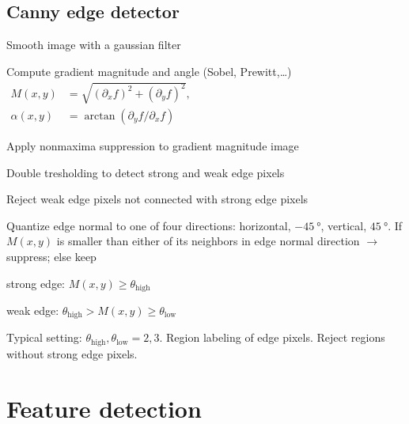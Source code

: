 \subsection{Canny edge detector}
\begin{enumerate*}[label=\protect\circled{\arabic*},itemjoin=]
	\item Smooth image with a gaussian filter\\
	\item Compute gradient magnitude and angle (Sobel, Prewitt,\ldots)\\
		$
		\begin{aligned}
			M(x,y)&=\sqrt{\left( \partial_xf \right)^2+\left( \partial_yf \right)^2},\\
			\alpha(x,y)&=\arctan\left( \partial_yf/\partial_xf \right)
		\end{aligned}
		$\\
	\item Apply nonmaxima suppression to gradient magnitude image\\
	\item Double tresholding to detect strong and weak edge pixels\\
	\item Reject weak edge pixels not connected with strong edge pixels\\
\end{enumerate*}
\begin{compactdesc}
	\item[\lp{Canny nonmaxima suppression}] Quantize edge normal to one of four directions: horizontal, $\SI{-45}{\degree}$, vertical, $\SI{+45}{\degree}$. If $M(x,y)$ is smaller than either of its neighbors in edge normal direction $\to$ suppress; else keep
	\item[\lp{Double-thresh. of grad. magn.}]\mbox{}
		\begin{compactdesc}
			\item[strong edge:] $M(x,y)\geq\theta_{\text{high}}$
			\item[weak edge:] $\theta_{\text{high}}>M(x,y)\geq\theta_{\text{low}}$
		\end{compactdesc}
		Typical setting: $\theta_{\text{high}},\theta_{\text{low}}=2,3$. Region labeling of edge pixels. Reject regions without strong edge pixels.
\end{compactdesc}
\section{Feature detection}
